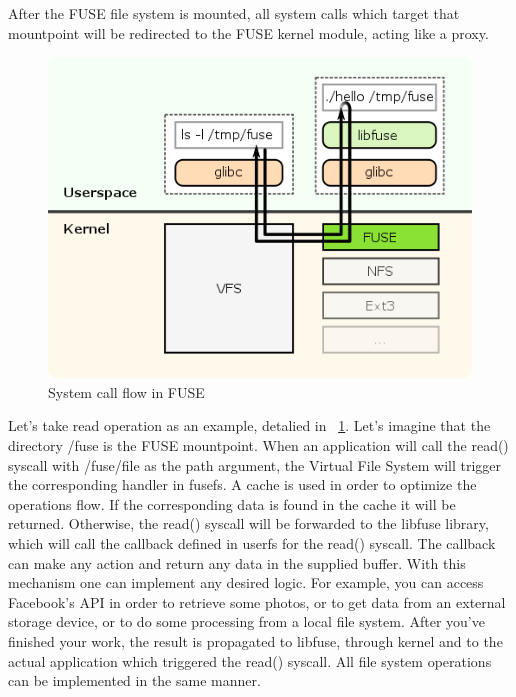         After the FUSE file system is mounted, all system calls which target that mountpoint will be redirected to the FUSE kernel module, acting like a proxy.

        \begin{figure}[h]
           \begin{center}
               \includegraphics[width=\textwidth]{theoretical/fuse.png}
            \end{center}
            \caption{System call flow in FUSE \cite{FuseArch}}
            \label{fig:fuse}
        \end{figure}

        Let's take read operation as an example, detalied in ~\ref{fig:fuse}. Let's imagine that the directory /fuse is the FUSE mountpoint. When an application will call the read() syscall with /fuse/file as the path argument, the Virtual File System will trigger the corresponding handler in fusefs. A cache is used in order to optimize the operations flow. If the corresponding data is found in the cache it will be returned. Otherwise, the read() syscall will be forwarded to the libfuse library, which will call the callback defined in userfs for the read() syscall. The callback can make any action and return any data in the supplied buffer. With this mechanism one can implement any desired logic. For example, you can access Facebook's API in order to retrieve some photos, or to get data from an external storage device, or to do some processing from a local file system. After you've finished your work, the result is propagated to libfuse, through kernel and to the actual application which triggered the read() syscall. All file system operations can be implemented in the same manner.

